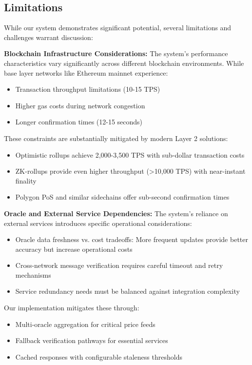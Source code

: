 \documentclass[twocolumn,10pt,a4paper]{article}
\begin{document}
\subsection{Limitations}
While our system demonstrates significant potential, several limitations and challenges warrant discussion:

\textbf{Blockchain Infrastructure Considerations:}
The system's performance characteristics vary significantly across different blockchain environments. While base layer networks like Ethereum mainnet experience:
\begin{itemize}
    \item Transaction throughput limitations (10-15 TPS)
    \item Higher gas costs during network congestion
    \item Longer confirmation times (12-15 seconds)
\end{itemize}

These constraints are substantially mitigated by modern Layer 2 solutions:
\begin{itemize}
    \item Optimistic rollups achieve 2,000-3,500 TPS with sub-dollar transaction costs
    \item ZK-rollups provide even higher throughput (>10,000 TPS) with near-instant finality
    \item Polygon PoS and similar sidechains offer sub-second confirmation times
\end{itemize}

\textbf{Oracle and External Service Dependencies:}
The system's reliance on external services introduces specific operational considerations:
\begin{itemize}
    \item Oracle data freshness vs. cost tradeoffs: More frequent updates provide better accuracy but increase operational costs
    \item Cross-network message verification requires careful timeout and retry mechanisms
    \item Service redundancy needs must be balanced against integration complexity
\end{itemize}

Our implementation mitigates these through:
\begin{itemize}
    \item Multi-oracle aggregation for critical price feeds
    \item Fallback verification pathways for essential services
    \item Cached responses with configurable staleness thresholds
\end{itemize}
\end{document}
